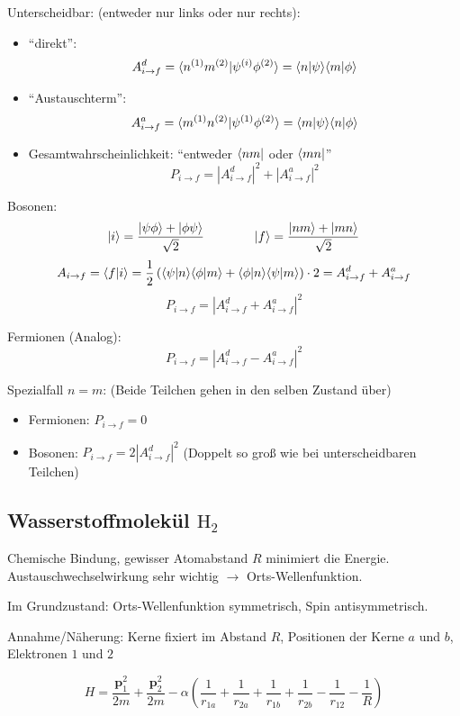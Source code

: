 \documentclass[11pt,a4paper]{report}
\renewcommand{\vec}{\boldsymbol}
\begin{document}
Unterscheidbar: (entweder nur links oder nur rechts):
\begin{itemize}
\item ``direkt'': $$A^d_{i\rightarrow f} = \langle n^{(1)}m^{(2)} | \psi^{(i)}\phi^{(2)} \rangle=\langle n | \psi \rangle\langle m | \phi \rangle$$
\item ``Austauschterm'': $$A^a_{i\rightarrow f}=\langle m^{(1)}n^{(2)} | \psi^{(1)}\phi^{(2)} \rangle=\langle m | \psi \rangle\langle n | \phi \rangle$$
\item Gesamtwahrscheinlichkeit: ``entweder $\langle nm |$ oder $\langle mn |$''
$$P_{i\rightarrow f}=|A^d_{i\rightarrow f}|^2+|A^a_{i\rightarrow f}|^2$$
\end{itemize}

Bosonen:
$$|i\rangle=\frac{|\psi\phi\rangle+|\phi\psi\rangle}{\sqrt{2}}\qquad\qquad|f\rangle=\frac{|nm\rangle+|mn\rangle}{\sqrt{2}}$$
$$A_{i\rightarrow f} = \langle f | i \rangle = \frac{1}{2}\left(\langle \psi | n \rangle\langle \phi | m \rangle+\langle \phi | n \rangle\langle \psi | m \rangle\right)\cdot 2 = A^d_{i\rightarrow f}+A^a_{i\rightarrow f}$$
$$P_{i\rightarrow f} = \left|A^d_{i\rightarrow f}+A^a_{i\rightarrow f}\right|^2$$

Fermionen (Analog):
$$P_{i\rightarrow f} = \left|A^d_{i\rightarrow f}-A^a_{i\rightarrow f}\right|^2$$

Spezialfall $n=m$: (Beide Teilchen gehen in den selben Zustand über)
\begin{itemize}
\item Fermionen: $P_{i\rightarrow f}=0$
\item Bosonen: $P_{i\rightarrow f}=2|A^d_{i\rightarrow f}|^2$ (Doppelt so groß wie bei unterscheidbaren Teilchen)
\end{itemize}

\subsection{Wasserstoffmolekül $\mathrm{H}_2$}

Chemische Bindung, gewisser Atomabstand $R$ minimiert die Energie. Austauschwechselwirkung sehr wichtig $\rightarrow$ Orts-Wellenfunktion.\par 

Im Grundzustand: Orts-Wellenfunktion symmetrisch, Spin antisymmetrisch.\par 

Annahme/Näherung: Kerne fixiert im Abstand $R$, Positionen der Kerne $a$ und $b$, Elektronen $1$ und $2$

$$H=\frac{\vec{p}_1^2}{2m}+\frac{\vec{p}_2^2}{2m}-\alpha\left(\frac{1}{r_{1a}}+\frac{1}{r_{2a}}+\frac{1}{r_{1b}}+\frac{1}{r_{2b}}-\frac{1}{r_{12}}-\frac{1}{R}\right)$$
\end{document}
